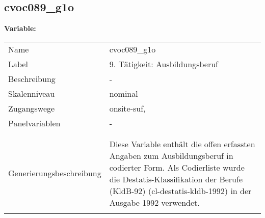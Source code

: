 	
	
	\subsection{cvoc089\_g1o}
	\label{subSection:cvoc089_g1o}

	\noindent\textbf{Variable:}\\
		\begin{tabular}{lL{11.3cm}}
			\label{tableVariable:cvoc089_g1o}
			Name & cvoc089\_g1o \\
			Label & 9. Tätigkeit: Ausbildungsberuf \\
			Beschreibung & - \\
			Skalenniveau & nominal \\
			Zugangswege &
				onsite-suf,
 \\
			Panelvariablen & -
			 \\
			 \\
 \\
					Generierungsbeschreibung & Diese Variable enthält die offen erfassten Angaben zum Ausbildungsberuf in codierter Form. Als Codierliste wurde die Destatis-Klassifikation der Berufe (KldB-92) (cl-destatis-kldb-1992) in der Ausgabe 1992 verwendet. 
				 \\	
			 \\
		\end{tabular}






